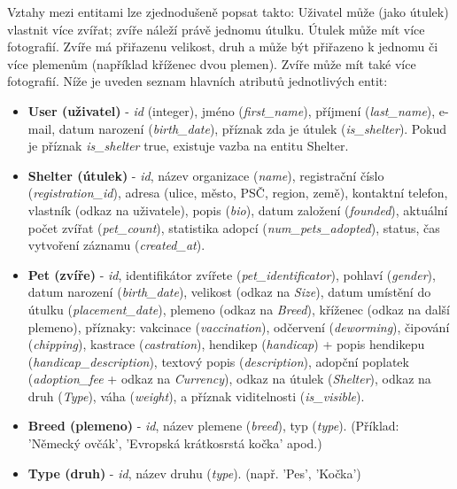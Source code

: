 \documentclass[czech, bp, kiv, he, iso690numb, pdf]{fasthesis}
\begin{document}
    Vztahy mezi entitami lze zjednodušeně popsat takto: Uživatel může (jako útulek) vlastnit více zvířat; zvíře náleží právě jednomu útulku. Útulek může mít více fotografií. Zvíře má přiřazenu velikost, druh a může být přiřazeno k jednomu či více plemenům (například kříženec dvou plemen). Zvíře může mít také více fotografií. Níže je uveden seznam hlavních atributů jednotlivých entit:

    \begin{itemize}
        \item \textbf{User (uživatel)} - \textit{id} (integer), jméno (\textit{first\_name}), příjmení (\textit{last\_name}), e-mail, datum narození (\textit{birth\_date}), příznak zda je útulek (\textit{is\_shelter}). Pokud je příznak \textit{is\_shelter} true, existuje vazba na entitu Shelter.

        \item \textbf{Shelter (útulek)} - \textit{id}, název organizace (\textit{name}), registrační číslo (\textit{registration\_id}), adresa (ulice, město, PSČ, region, země), kontaktní telefon, vlastník (odkaz na uživatele), popis (\textit{bio}), datum založení (\textit{founded}), aktuální počet zvířat (\textit{pet\_count}), statistika adopcí (\textit{num\_pets\_adopted}), status, čas vytvoření záznamu (\textit{created\_at}).

        \item \textbf{Pet (zvíře)} - \textit{id}, identifikátor zvířete (\textit{pet\_identificator}), pohlaví (\textit{gender}), datum narození (\textit{birth\_date}), velikost (odkaz na \textit{Size}), datum umístění do útulku (\textit{placement\_date}), plemeno (odkaz na \textit{Breed}), kříženec (odkaz na další plemeno), příznaky: vakcinace (\textit{vaccination}), odčervení (\textit{deworming}), čipování (\textit{chipping}), kastrace (\textit{castration}), hendikep (\textit{handicap}) + popis hendikepu (\textit{handicap\_description}), textový popis (\textit{description}), adopční poplatek (\textit{adoption\_fee} + odkaz na \textit{Currency}), odkaz na útulek (\textit{Shelter}), odkaz na druh (\textit{Type}), váha (\textit{weight}), a příznak viditelnosti (\textit{is\_visible}).

        \item \textbf{Breed (plemeno)} - \textit{id}, název plemene (\textit{breed}), typ (\textit{type}). (Příklad: 'Německý ovčák', 'Evropská krátkosrstá kočka' apod.)

        \item \textbf{Type (druh)} - \textit{id}, název druhu (\textit{type}). (např. 'Pes', 'Kočka')


\end{itemize}
\end{document}
